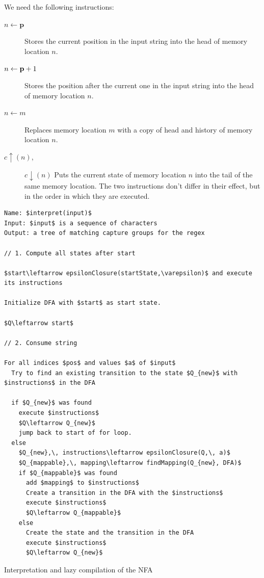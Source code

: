 \documentclass[english]{sigplanconf}
\begin{document}
We need the following instructions:
\begin{description}
\item [{$n\leftarrow\mathbf{p}$}] Stores the current position in the input
string into the head of memory location $n$.
\item [{$n\leftarrow\mathbf{\mathbf{p}}+1$}] Stores the position after the current one
in the input string into the head of memory location $n$.
\item [{$n\leftarrow m$}] Replaces memory location $m$ with a copy of
head and history of memory location $n$.
\item [{$c\uparrow(n)$,}] $c\downarrow(n)$ Puts the current state of
memory location $n$ into the tail of the same memory location. The
two instructions don't differ in their effect, but in the order in
which they are executed.
\end{description}
\begin{algorithm*}[tb]
\begin{lstlisting}[mathescape]
Name: $interpret(input)$
Input: $input$ is a sequence of characters
Output: a tree of matching capture groups for the regex

// 1. Compute all states after start

$start\leftarrow epsilonClosure(startState,\varepsilon)$ and execute its instructions

Initialize DFA with $start$ as start state.

$Q\leftarrow start$

// 2. Consume string

For all indices $pos$ and values $a$ of $input$
  Try to find an existing transition to the state $Q_{new}$ with $instructions$ in the DFA

  if $Q_{new}$ was found
    execute $instructions$
    $Q\leftarrow Q_{new}$
    jump back to start of for loop.
  else
    $Q_{new},\, instructions\leftarrow epsilonClosure(Q,\, a)$
    $Q_{mappable},\, mapping\leftarrow findMapping(Q_{new}, DFA)$
    if $Q_{mappable}$ was found
      add $mapping$ to $instructions$
      Create a transition in the DFA with the $instructions$
      execute $instructions$
      $Q\leftarrow Q_{mappable}$
    else
      Create the state and the transition in the DFA
      execute $instructions$
      $Q\leftarrow Q_{new}$
\end{lstlisting}
\caption{Interpretation and lazy compilation of the NFA}
\end{algorithm*}
\end{document}
